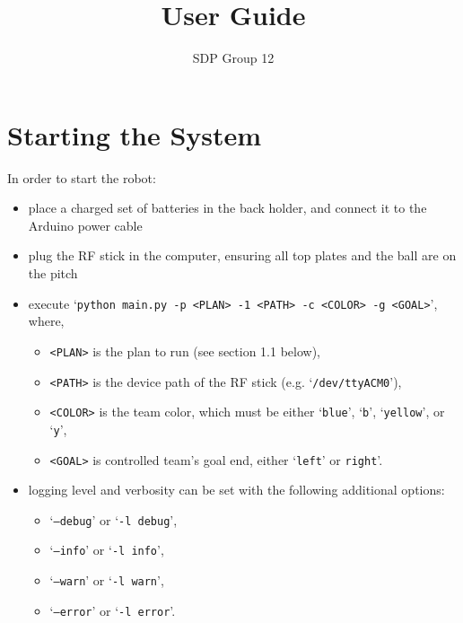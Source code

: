 \documentclass[12pt,a4paper]{article}
\author{SDP Group 12}
\title{User Guide}
\begin{document}
\maketitle




\section{Starting the System}

In order to start the robot: 

\begin{itemize}
    \item place a charged set of batteries in the back holder, and connect it to the Arduino power cable
    \item plug the RF stick in the computer, ensuring all top plates and the ball are on the pitch
    \item execute `\texttt{python main.py -p <PLAN> -1 <PATH> -c <COLOR> -g <GOAL>}', where,
    \begin{itemize}[label=$\circ$]
        \item \texttt{<PLAN>} is the plan to run (see section 1.1 below),
        \item \texttt{<PATH>} is the device path of the RF stick (e.g. `\verb$/dev/ttyACM0$'),
        \item \texttt{<COLOR>} is the team color, which must be either `\texttt{blue}', `\texttt{b}', `\texttt{yellow}', or `\texttt{y}',
        \item \texttt{<GOAL>} is controlled team's goal end, either `\texttt{left}' or \texttt{right}'.
    \end{itemize}
    \item logging level and verbosity can be set with the following additional options:
    \begin{itemize}[label=$\circ$]
        \item `\texttt{--debug}' or `\texttt{-l debug}',
        \item `\texttt{--info}' or `\texttt{-l info}',
        \item `\texttt{--warn}' or `\texttt{-l warn}',
        \item `\texttt{--error}' or `\texttt{-l error}'.
    \end{itemize}
    \end{itemize}
\end{document}
